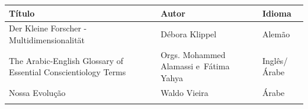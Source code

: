 \documentclass{gescons}
\begin{document}
\begin{longtable}[]{@{}
  >{\raggedright\arraybackslash}p{}
  >{\raggedright\arraybackslash}p{}
  >{\raggedright\arraybackslash}p{}@{}}
  \toprule\noalign{}
\begin{minipage}[t]{\linewidth}\centering
\textbf{Título}
\end{minipage} & \begin{minipage}[t]{\linewidth}\centering
\textbf{Autor}
\end{minipage} & \begin{minipage}[t]{\linewidth}\centering
\textbf{Idioma}
\end{minipage} \\
\hline
\begin{minipage}[t]{\linewidth}\raggedright
Der Kleine Forscher - Multidimensionalität
\end{minipage} & \begin{minipage}[t]{\linewidth}\raggedright
Débora Klippel
\end{minipage} & \begin{minipage}[t]{\linewidth}\centering
Alemão
\end{minipage} \\
\hline
\begin{minipage}[t]{\linewidth}\raggedright
The Arabic-English Glossary of Essential Conscientiology Terms
\end{minipage} & \begin{minipage}[t]{\linewidth}\raggedright
Orgs. Mohammed Alamassi e~Fátima Yahya
\end{minipage} & \begin{minipage}[t]{\linewidth}\centering
Inglês/Árabe
\end{minipage} \\
\hline
\begin{minipage}[t]{\linewidth}\raggedright
Nossa Evolução
\end{minipage} & \begin{minipage}[t]{\linewidth}\raggedright
Waldo Vieira
\end{minipage} & \begin{minipage}[t]{\linewidth}\centering
Árabe
\end{minipage} \\
\hline
\begin{minipage}[t]{\linewidth}\raggedright

\end{minipage}
\end{longtable}
\end{document}
